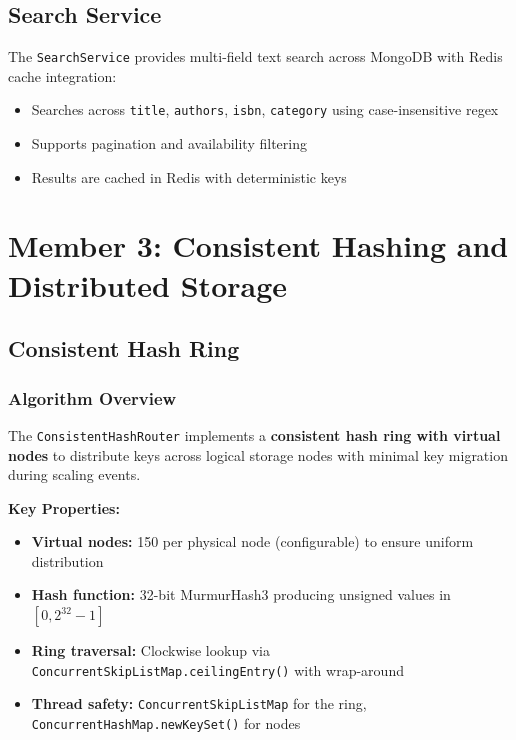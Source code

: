 \documentclass[12pt,a4paper]{report}
\begin{document}
\section{Search Service}
The \texttt{SearchService} provides multi-field text search across MongoDB with Redis cache integration:
\begin{itemize}[noitemsep]
    \item Searches across \texttt{title}, \texttt{authors}, \texttt{isbn}, \texttt{category} using case-insensitive regex
    \item Supports pagination and availability filtering
    \item Results are cached in Redis with deterministic keys
\end{itemize}


\chapter{Member 3: Consistent Hashing and Distributed Storage}

\section{Consistent Hash Ring}

\subsection{Algorithm Overview}
The \texttt{ConsistentHashRouter} implements a \textbf{consistent hash ring with virtual nodes} to distribute keys across logical storage nodes with minimal key migration during scaling events.

\textbf{Key Properties:}
\begin{itemize}[noitemsep]
    \item \textbf{Virtual nodes:} 150 per physical node (configurable) to ensure uniform distribution
    \item \textbf{Hash function:} 32-bit MurmurHash3 producing unsigned values in $[0, 2^{32}-1]$
    \item \textbf{Ring traversal:} Clockwise lookup via \texttt{ConcurrentSkipListMap.ceilingEntry()} with wrap-around
    \item \textbf{Thread safety:} \texttt{ConcurrentSkipListMap} for the ring, \texttt{ConcurrentHashMap.newKeySet()} for nodes
\end{itemize}
\end{document}
